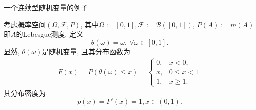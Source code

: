 \documentclass[Prob-All.tex]{subfiles}
\begin{document}


\begin{frame}{一个连续型随机变量的例子}
\begin{exam}
  考虑概率空间$(\Omega,\mathcal{F}, P)$, 其中$\Omega:=[0,1], \mathcal{F}:=\mathcal{B}([0,1])$, $P(A):=m(A)$即$A$的Lebesgue测度. 定义
  \[\theta(\omega)=\omega, \ \forall \omega\in [0,1].\]
  \pause 显然, $\theta(\omega)$是随机变量, 且其分布函数为\pause
  \begin{eqnarray*}
	F(x)=P(\theta(\omega)\leq x)=\left\{
		\begin{array}{ll}
		 0, & x<0,\\
		 x, & 0\leq x<1\\
		 1, & x\geq 1.
		\end{array}
		\right.
  \end{eqnarray*}
其分布密度为
\[p(x)=F'(x)=1, x\in (0,1).\]

\end{exam}


\end{frame}
\end{document}
